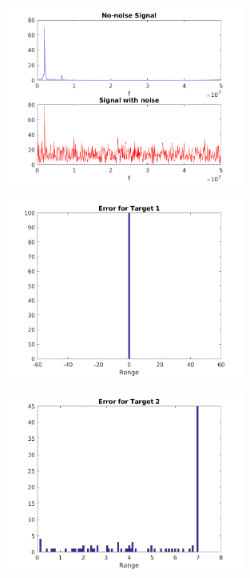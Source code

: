 \documentclass[a4paper,11pt]{article}
\begin{document}
\begin{figure}[!hp]
    \begin{center}
      \includegraphics[width=0.7\textwidth]{images/signals_10.png}
    \end{center}
\end{figure}

\begin{figure}[!hp]
    \begin{center}
      \includegraphics[width=0.7\textwidth]{images/hist_e1_10.png}
    \end{center}
\end{figure}

\begin{figure}[!hp]
    \begin{center}
      \includegraphics[width=0.7\textwidth]{images/hist_e2_10.png}
    \end{center}
\end{figure}
\end{document}
